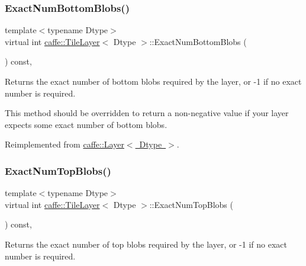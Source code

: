 \subsubsection{\texorpdfstring{Exact\+Num\+Bottom\+Blobs()}{ExactNumBottomBlobs()}\hspace{0.1cm}{\footnotesize\ttfamily [2/2]}}
{\footnotesize\ttfamily template$<$typename Dtype$>$ \\
virtual int \mbox{\hyperlink{classcaffe_1_1_tile_layer}{caffe\+::\+Tile\+Layer}}$<$ Dtype $>$\+::Exact\+Num\+Bottom\+Blobs (\begin{DoxyParamCaption}{ }\end{DoxyParamCaption}) const\hspace{0.3cm}{\ttfamily [inline]}, {\ttfamily [virtual]}}



Returns the exact number of bottom blobs required by the layer, or -\/1 if no exact number is required. 

This method should be overridden to return a non-\/negative value if your layer expects some exact number of bottom blobs. 

Reimplemented from \mbox{\hyperlink{classcaffe_1_1_layer_a8e5ee0494d85f5f55fc4396537cbc60f}{caffe\+::\+Layer$<$ Dtype $>$}}.

\mbox{\label{classcaffe_1_1_tile_layer_a1040cc3b4fb028d54f67a685513d745b}} 
\subsubsection{\texorpdfstring{Exact\+Num\+Top\+Blobs()}{ExactNumTopBlobs()}\hspace{0.1cm}{\footnotesize\ttfamily [1/2]}}
{\footnotesize\ttfamily template$<$typename Dtype$>$ \\
virtual int \mbox{\hyperlink{classcaffe_1_1_tile_layer}{caffe\+::\+Tile\+Layer}}$<$ Dtype $>$\+::Exact\+Num\+Top\+Blobs (\begin{DoxyParamCaption}{ }\end{DoxyParamCaption}) const\hspace{0.3cm}{\ttfamily [inline]}, {\ttfamily [virtual]}}



Returns the exact number of top blobs required by the layer, or -\/1 if no exact number is required. 

